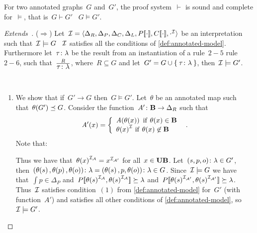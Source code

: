 
\begin{proposition}
  For two annotated graphs~$G$ and~$G'$, the proof system~$\vdash$ is sound and complete for~$\models$, that is~$G
  \vdash G'$ \iff~$G \models G'$.
\end{proposition}


\begin{proof}[Extends~\citep{MunozPerezGutierrez:2009aa}]
  ($\Rightarrow$) 
  Let~$\mathcal{I}=\langle \Delta_{R}, \Delta_{P}, \Delta_{C}, \Delta_{L}, {P[\![\cdot]\!]}, {C[\![\cdot]\!]},{\cdot}^{\mathcal{I}} \rangle$ be an
  interpretation such that~$\mathcal{I} \models G$ \ie~$\mathcal{I}$ satisfies all the conditions of \cref{def:annotated-model}.
  Furthermore let~$\mbox{$\tau\colon\lambda$}$ be the result from an instantiation of a \ifnormalisedardf rule~$2-5$\else
  rule~$2-6$\fi, such that~$\frac{R}{\mbox{$\tau\colon\lambda$}}$, where~$R \subseteq G$ and
  let~$G'=G\cup\left\{\:\mbox{$\tau\colon\lambda$}\:\right\}$,
  then~$\mathcal{I} \models G'$.
  \begin{description}[nosep]
  \item[1. Simple:]~
    \begin{enumerate}[label=(\alph*),nosep]
    \item We show that if~$G' \to G$ then~$G \models G'$.  Let~$\theta$ be an annotated map such that~$\mathit{\theta}\!\left(G'\right)
      \preceq G$. Consider the function~$A' \colon \mathbf{B} \to \Delta_R$ such that~$$\mathit{A'}\!\left(x\right) =
      \left\{\begin{array}{l}\mathit{A}\!\left(\mathit{\theta}\!\left(x\right)\right)~\mathrm{if}~\mathit{\theta}\!\left(x\right) \in \mathbf{B}\\
          {\mathit{\theta}\!\left(x\right)}^{\mathcal{I}}~\mathrm{if}~\mathit{\theta}\!\left(x\right) \not\in \mathbf{B}
        \end{array}\right. \enspace .$$
      Note that:
      Thus we have that~${\mathit{\theta}\!\left(x\right)}^{\mathcal{I}_{\mathcal{A}}} = {x}^{\mathcal{I}_{\mathcal{A}'}}$ for all~$x\in\mathbf{UB}$.
      Let~$\mbox{$(s,p,o)\colon\lambda$} \in G'$,
      then~$\mbox{$(\mathit{\theta}\!\left(s\right),\mathit{\theta}\!\left(p\right),\mathit{\theta}\!\left(o\right))\colon\lambda$} =
      \mbox{$(\mathit{\theta}\!\left(s\right),p,\mathit{\theta}\!\left(o\right))\colon\lambda$} \in G$.
      Since~$\mathcal{I} \models G$ we have that~$\int{p} \in \Delta_P$ and~${P[\![{\mathit{\theta}\!\left(s\right)}^{\mathcal{I}_{\mathcal{A}}},{\mathit{\theta}\!\left(s\right)}^{\mathcal{I}_{\mathcal{A}}}]\!]}
      \succeq \lambda$ and~${P[\![{\mathit{\theta}\!\left(s\right)}^{\mathcal{I}_{\mathcal{A}'}},{\mathit{\theta}\!\left(s\right)}^{\mathcal{I}_{\mathcal{A}'}}]\!]} \succeq \lambda$.  
      Thus~$\mathcal{I}$ satisfies condition~$(1)$ from \cref{def:annotated-model} for~$G'$ (with function~$A'$) and satisfies
      all other conditions of \cref{def:annotated-model}, so~$\mathcal{I} \models G'$.


\end{enumerate}
\end{description}
\end{proof}

